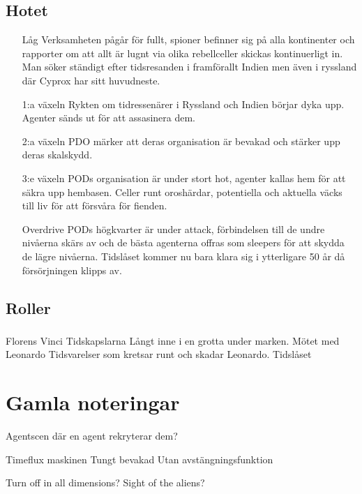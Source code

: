 \documentclass[a5paper,10pt]{report}
\begin{document}
\subsection{Hotet}
\begin{itemize}
  \item[Låg] Verksamheten pågår för fullt, spioner befinner sig på alla kontinenter och rapporter om att allt är lugnt via olika rebellceller skickas kontinuerligt in. Man söker ständigt efter tidsresanden i framförallt Indien men även i ryssland där Cyprox har sitt huvudneste.
  \item[1:a växeln] Rykten om tidressenärer i Ryssland och Indien börjar dyka upp. Agenter sänds ut för att assasinera dem.
  \item[2:a växeln] PDO märker att deras organisation är bevakad och stärker upp deras skalskydd.
  \item[3:e växeln] PODs organisation är under stort hot, agenter kallas hem för att säkra upp hembasen. Celler runt oroshärdar, potentiella och aktuella väcks till liv för att försvåra för fienden.
  \item[Overdrive] PODs högkvarter är under attack, förbindelsen till de undre nivåerna skärs av och de bästa agenterna offras som sleepers för att skydda de lägre nivåerna. Tidslåset kommer nu bara klara sig i ytterligare 50 år då försörjningen klipps av.
\end{itemize}
\subsection{Roller}
\subsubsection{}

Florens
Vinci
Tidskapslarna
Långt inne i en grotta under marken.
Mötet med Leonardo
Tidsvarelser som kretsar runt och skadar Leonardo.
Tidslåset
\clearpage
\section{Gamla noteringar}

Agentscen där en agent rekryterar dem?

Timeflux maskinen
  Tungt bevakad
  Utan avstängningsfunktion

Turn off in all dimensions?
  Sight of the aliens?
\end{document}
